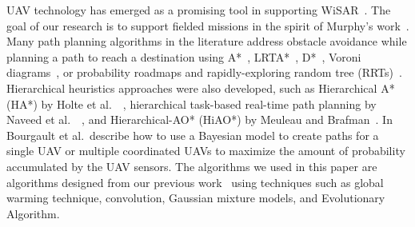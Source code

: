 \documentclass[journal]{IEEEtran}
\begin{document}

UAV technology has emerged as a promising tool in supporting WiSAR~\cite{Murphy2008Cooperative,Bourgault2003Coordinated}. The goal of our research is to support fielded missions in the spirit of Murphy's work~\cite{Casper2003Human}. Many path planning algorithms in the literature address obstacle avoidance while planning a path to reach a destination using A*~\cite{Quigley2005Towards}, LRTA*~\cite{Howlett2006Learning}, D*~\cite{Stentz1997Optimal}, Voroni diagrams~\cite{Bortoff2000Path,Beard2005Autonomous}, or probability roadmaps and rapidly-exploring random tree (RRTs)~\cite{Pettersson2006Probabilistic}. Hierarchical heuristics approaches were also developed, such as Hierarchical A* (HA*) by Holte et al.\ ~\cite{Holte1996Hierarchical}, hierarchical task-based real-time path planning by Naveed et al.\ ~\cite{Meuleau2007Hierarchical}, and Hierarchical-AO* (HiAO*) by Meuleau and Brafman~\cite{Naveed2010Hierarchical}. In~\cite{Bourgault2006Optimal, Bourgault2004Coordinated} Bourgault et al.\ describe how to use a Bayesian model to create paths for a single UAV or multiple coordinated UAVs to maximize the amount of probability accumulated by the UAV sensors. The algorithms we used in this paper are algorithms designed from our previous work~\cite{Lin2009UAV,Lin2014Hierarchical} using techniques such as global warming technique, convolution, Gaussian mixture models, and Evolutionary Algorithm.

\end{document}

